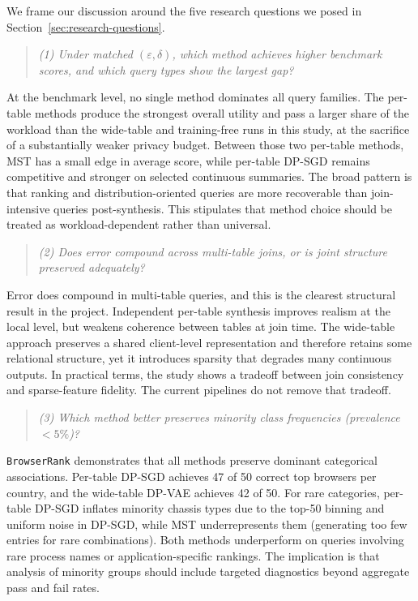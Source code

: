 \documentclass[12pt,letterpaper]{article}
\renewcommand{\_}{\textunderscore\allowbreak}
\begin{document}
We frame our discussion around the five research questions we posed in Section~\ref{sec:research-questions}.

\begin{quote}
\textit{(1) Under matched $(\varepsilon,\delta)$, which method achieves higher benchmark scores, and which query types show the largest gap?}
\end{quote}

At the benchmark level, no single method dominates all query families. The per-table methods produce the strongest overall utility and pass a larger share of the workload than the wide-table and training-free runs in this study, at the sacrifice of a substantially weaker privacy budget. Between those two per-table methods, MST has a small edge in average score, while per-table DP-SGD remains competitive and stronger on selected continuous summaries. The broad pattern is that ranking and distribution-oriented queries are more recoverable than join-intensive queries post-synthesis. This stipulates that method choice should be treated as workload-dependent rather than universal.

\begin{quote}
\textit{(2) Does error compound across multi-table joins, or is joint structure preserved adequately?}
\end{quote}

Error does compound in multi-table queries, and this is the clearest structural result in the project. Independent per-table synthesis improves realism at the local level, but weakens coherence between tables at join time. The wide-table approach preserves a shared client-level representation and therefore retains some relational structure, yet it introduces sparsity that degrades many continuous outputs. In practical terms, the study shows a tradeoff between join consistency and sparse-feature fidelity. The current pipelines do not remove that tradeoff.

\begin{quote}
\textit{(3) Which method better preserves minority class frequencies (prevalence $<5\%$)?}
\end{quote}

\texttt{BrowserRank} demonstrates that all methods preserve dominant categorical associations. Per-table DP-SGD achieves 47 of 50 correct top browsers per country, and the wide-table DP-VAE achieves 42 of 50. For rare categories, per-table DP-SGD inflates minority chassis types due to the top-50 binning and uniform noise in DP-SGD, while MST underrepresents them (generating too few entries for rare combinations). Both methods underperform on queries involving rare process names or application-specific rankings. The implication is that analysis of minority groups should include targeted diagnostics beyond aggregate pass and fail rates.
\end{document}
